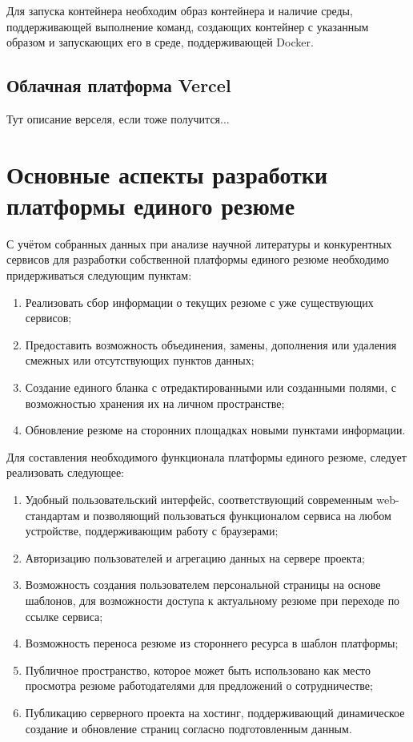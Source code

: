 \documentclass[master, och, diploma]{SCWorks}
\begin{document}
Для запуска контейнера необходим образ контейнера и наличие среды, поддерживающей выполнение команд, создающих контейнер с указанным образом и запускающих его в среде, поддерживающей Docker\cite{docker_documentation}.



\subsection{Облачная платформа Vercel}
Тут описание верселя, если тоже получится...






\section{Основные аспекты разработки платформы единого резюме}
С учётом собранных данных при анализе научной литературы и конкурентных сервисов для разработки собственной платформы единого резюме необходимо придерживаться следующим пунктам:
\begin{enumerate}
    \item Реализовать сбор информации о текущих резюме с уже существующих сервисов;
    \item Предоставить возможность объединения, замены, дополнения или удаления 
    смежных или отсутствующих пунктов данных;
    \item Создание единого бланка с отредактированными или созданными полями, 
    с возможностью хранения их на личном пространстве;
    \item Обновление резюме на сторонних площадках новыми пунктами информации.
\end{enumerate}

Для составления необходимого функционала платформы единого резюме, следует реализовать следующее:
\begin{enumerate}
    \item Удобный пользовательский интерфейс, соответствующий современным web-стандартам 
    и позволяющий пользоваться функционалом сервиса на любом устройстве, поддерживающим 
    работу с браузерами;
    \item Авторизацию пользователей и агрегацию данных на сервере проекта;
    \item Возможность создания пользователем персональной страницы на основе шаблонов, 
    для возможности доступа к актуальному резюме при переходе по ссылке сервиса;
    \item Возможность переноса резюме из стороннего ресурса в шаблон платформы;
    \item Публичное пространство, которое может быть использовано как место просмотра 
    резюме работодателями для предложений о сотрудничестве;
    \item Публикацию серверного проекта на хостинг, поддерживающий динамическое 
    создание и обновление страниц согласно подготовленным данным.
\end{enumerate}
\end{document}
